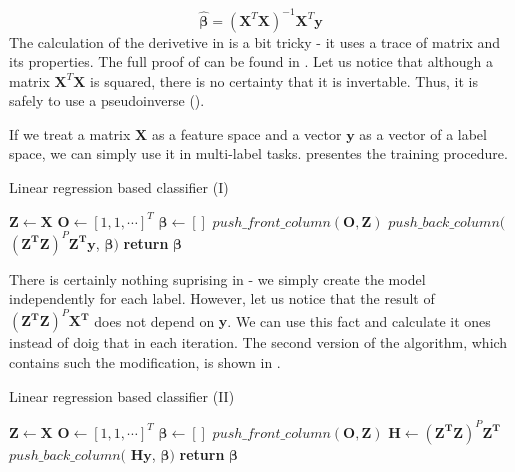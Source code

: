 \begin{equation}\label{eq:LR5}
    \boldsymbol{\hat{\beta}} = (\boldsymbol{X}^T\boldsymbol{X})^{-1}\boldsymbol{X}^T\boldsymbol{y}
\end{equation}
The calculation of the derivetive in  is a bit tricky - it uses a trace of matrix and its properties. The full proof of  can be found in . Let us notice that although a matrix $\boldsymbol{X}^T\boldsymbol{X}$ is squared, there is no certainty that it is invertable. Thus, it is safely to use a pseudoinverse (\cite{Trevor}).

If we treat a matrix $\boldsymbol{X}$ as a feature space and a vector $\boldsymbol{y}$ as a vector of a label space, we can simply use it in multi-label tasks.  presentes the training procedure.

\begin{algorithm}
    \caption{Linear regression based classifier (I)}\label{alg:LR0}
    \begin{algorithmic}[1]
        \State $\boldsymbol{Z} \gets \boldsymbol{X}$ 
        \State $\boldsymbol{O} \gets [1, 1, \cdots]^T$ 
        \State $\boldsymbol{\beta} \gets []$
        \State $push\_front\_column(\boldsymbol{O}, \boldsymbol{Z})$
            \State $push\_back\_column($ $(\boldsymbol{Z^T}\boldsymbol{Z})^P\boldsymbol{Z^T}\boldsymbol{y}$, $\boldsymbol{\beta})$ 
        \EndFor
        \State \textbf{return} $\boldsymbol{\beta}$
    \EndProcedure
    \end{algorithmic}
\end{algorithm}
There is certainly nothing suprising in  - we simply create the model independently for each label. However, let us notice that the result of $(\boldsymbol{Z^T}\boldsymbol{Z})^P\boldsymbol{X^T}$ does not depend on $\boldsymbol{y}$. We can use this fact and calculate it ones instead of doig that in each iteration. The second version of the algorithm, which contains such the modification, is shown in . 

\begin{algorithm}
    \caption{Linear regression based classifier (II)}\label{alg:LR1}
    \begin{algorithmic}[1]
        \State $\boldsymbol{Z} \gets \boldsymbol{X}$ 
        \State $\boldsymbol{O} \gets [1, 1, \cdots]^T$ 
        \State $\boldsymbol{\beta} \gets []$
        \State $push\_front\_column(\boldsymbol{O}, \boldsymbol{Z})$
        \State $\boldsymbol{H} \gets (\boldsymbol{Z^T}\boldsymbol{Z})^P\boldsymbol{Z^T}$
            \State $push\_back\_column($ $\boldsymbol{H}\boldsymbol{y}$, $\boldsymbol{\beta})$ 
        \EndFor
        \State \textbf{return} $\boldsymbol{\beta}$
    \EndProcedure
    \end{algorithmic}
\end{algorithm}


